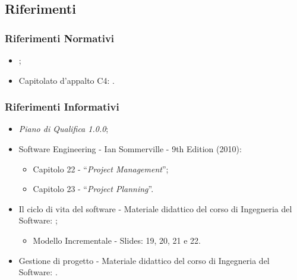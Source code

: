 \subsection{Riferimenti}
\subsubsection{Riferimenti Normativi}
\begin{itemize}
    \item \NdP;
    \item Capitolato\glo{} d'appalto C4: \newline {}.
\end{itemize}

\subsubsection{Riferimenti Informativi}
\begin{itemize}
    \item \textit{Piano di Qualifica 1.0.0};
    \item Software Engineering - Ian Sommerville - 9th Edition (2010):
        \begin{itemize}
            \item Capitolo 22 - “\textit{Project Management}”;
            \item Capitolo 23 - “\textit{Project Planning}”.
        \end{itemize}
    \item Il ciclo di vita del software - Materiale didattico del corso di Ingegneria del Software: \newline {};
        \begin{itemize}
            \item Modello Incrementale - Slides: 19, 20, 21 e 22.
        \end{itemize}
    \item Gestione di progetto - Materiale didattico del corso di Ingegneria del Software: \newline {}.
\end{itemize}



